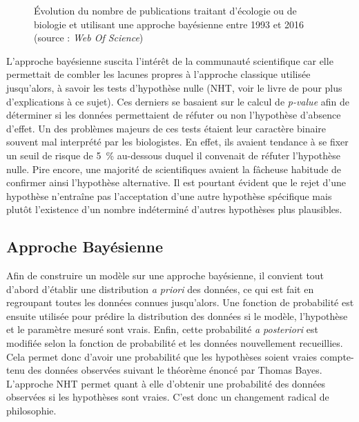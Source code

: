 \documentclass[11pt,twocolumn,twoside]{bopHomework}
\begin{document}
\begin{figure}[h]
  \centering{\graphfont}
  \caption{Évolution du nombre de publications traitant d'écologie ou de
    biologie et utilisant une approche bayésienne entre 1993 et 2016 (source :
    \textit{Web Of Science})}
  \label{fig:bibliometry}
\end{figure}

L'approche bayésienne suscita l'intérêt de la communauté scientifique car elle
permettait de combler les lacunes propres à l'approche classique utilisée
jusqu'alors, à savoir les tests d'hypothèse nulle (NHT, voir le livre de
\citet{fisher1925} pour plus d'explications à ce sujet).
Ces derniers se basaient sur le calcul de \textit{p-value} afin de déterminer si
les données permettaient de réfuter ou non l'hypothèse d'absence d'effet.
Un des problèmes majeurs de ces tests étaient leur caractère binaire souvent mal
interprété par les biologistes.
En effet, ils avaient tendance à se fixer un seuil de risque de 5~\% au-dessous
duquel il convenait de réfuter l'hypothèse nulle.
Pire encore, une majorité de scientifiques avaient la fâcheuse habitude de
confirmer ainsi l'hypothèse alternative.
Il est pourtant évident que le rejet d'une hypothèse n'entraîne pas
l'acceptation d'une autre hypothèse spécifique mais plutôt l'existence d'un
nombre indéterminé d'autres hypothèses plus plausibles.

\subsection{Approche Bayésienne}

Afin de construire un modèle sur une approche bayésienne, il convient tout
d'abord d'établir une distribution \textit{a priori} des données, ce qui est
fait en regroupant toutes les données connues jusqu'alors.
Une fonction de probabilité est ensuite utilisée pour prédire la distribution
des données si le modèle, l'hypothèse et le paramètre mesuré sont vrais.
Enfin, cette probabilité \textit{a posteriori} est modifiée selon la fonction de
probabilité et les données nouvellement recueillies.
Cela permet donc d'avoir une probabilité que les hypothèses soient vraies
compte-tenu des données observées suivant le théorème énoncé par Thomas Bayes.
L'approche NHT permet quant à elle d'obtenir une probabilité des données
observées si les hypothèses sont vraies.
C'est donc un changement radical de philosophie.
\end{document}
